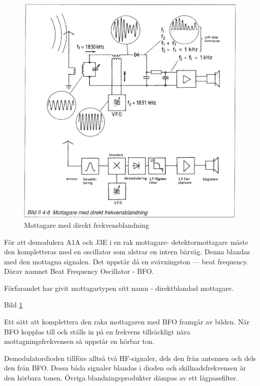 \begin{figure}
  \includegraphics[width=\textwidth]{images/bild_2_4-08}
  \caption{Mottagare med direkt frekvensblandning}
  \label{fig:bildII4-8}
\end{figure}

För att demodulera A1A och J3E i en rak mottagare-
detektormottagare måste den kompletteras med en oscillator som alstrar
en intern bärvåg. Denna blandas med den mottagna signalen. Det uppstår
då en svävningston --- beat frequency. Därav namnet Beat Frequency
Oscillator - BFO.

Förfarandet har givit mottagartypen sitt namn - direktblandad
mottagare.

Bild \ref{fig:bildII4-8}

Ett sätt att komplettera den raka mottagaren med BFO framgår av
bilden. När BFO kopplas till och ställs in på en frekvens tillräckligt
nära mottagningsfrekvensen så uppstår en hörbar ton.

Demodulatordioden tillförs alltså två HF-signaler, dels den från
antennen och dels den från BFO. Dessa båda signaler blandas i dioden
och skillnadsfrekvensen är den hörbara tonen. Övriga
blandningsprodukter dämpas av ett lågpassfilter.

